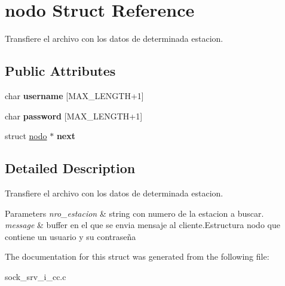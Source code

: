 \hypertarget{structnodo}{\section{nodo Struct Reference}
\label{structnodo}
}


Transfiere el archivo con los datos de determinada estacion.  


\subsection*{Public Attributes}
\begin{DoxyCompactItemize}
\item 
\hypertarget{structnodo_a5d4793a799fba4e7b6b2f85872db43ed}{char {\bfseries username} \mbox{[}M\-A\-X\-\_\-\-L\-E\-N\-G\-T\-H+1\mbox{]}}\label{structnodo_a5d4793a799fba4e7b6b2f85872db43ed}

\item 
\hypertarget{structnodo_af32520f4ef71fda18c1dba579a378470}{char {\bfseries password} \mbox{[}M\-A\-X\-\_\-\-L\-E\-N\-G\-T\-H+1\mbox{]}}\label{structnodo_af32520f4ef71fda18c1dba579a378470}

\item 
\hypertarget{structnodo_a972e12d38047211221e7892de67b321f}{struct \hyperlink{structnodo}{nodo} $\ast$ {\bfseries next}}\label{structnodo_a972e12d38047211221e7892de67b321f}

\end{DoxyCompactItemize}


\subsection{Detailed Description}
Transfiere el archivo con los datos de determinada estacion. 


\begin{DoxyParams}{Parameters}
{\em nro\-\_\-estacion} & string con numero de la estacion a buscar. \\
\hline
{\em message} & buffer en el que se envia mensaje al cliente.\-Estructura nodo que contiene un usuario y su contraseña \\
\hline
\end{DoxyParams}


The documentation for this struct was generated from the following file\-:\begin{DoxyCompactItemize}
\item 
sock\-\_\-srv\-\_\-i\-\_\-cc.\-c\end{DoxyCompactItemize}
